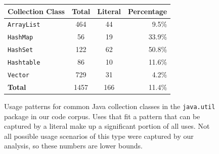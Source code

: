 \documentclass[10pt, conference, compsocconf]{IEEEtran}
\begin{document}
\begin{figure}\label{collections}
\vspace{2mm}
\begin{center}
\begin{tabular}{l|c|c|r}
Collection Class& Total & Literal & Percentage \\
\hline
\texttt{ArrayList} & 464	&	44	&	9.5\% \\
\texttt{HashMap}	& 56 & 19 & 33.9\% \\
\texttt{HashSet} & 122 & 62 & 50.8\% \\
\texttt{Hashtable} & 86 & 10 & 11.6\% \\
\texttt{Vector} & 729 & 31 & 4.2\% \\
\hline
\textbf{Total} & 1457 & 166 & 11.4\% \\
\hline
\end{tabular}
\caption{Usage patterns for common Java collection classes in the \texttt{java.util} package in our code corpus. Uses that fit a pattern that can be captured by a literal make up a significant portion of all uses. Not all possible usage scenarios of this type were captured by our analysis, so these numbers are lower bounds.}
\end{center}
\vspace{-2mm}
\end{figure}

%	

%	
\end{document}
